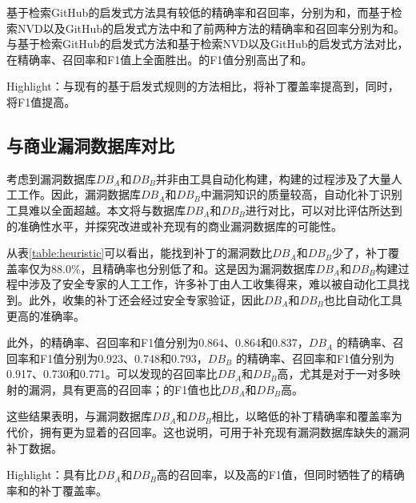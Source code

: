 基于检索GitHub的启发式方法具有较低的精确率和召回率，分别为和，而基于检索NVD以及GitHub的启发式方法中和了前两种方法的精确率和召回率分别为和。与基于检索GitHub的启发式方法和基于检索NVD以及GitHub的启发式方法对比，\tool 在精确率、召回率和F1值上全面胜出。\tool 的F1值分别高出了和。

\begin{tcolorbox}[size=title,opacityfill=0.15]
Highlight：与现有的基于启发式规则的方法相比，\tool 将补丁覆盖率提高到，同时，将F1值提高。
\end{tcolorbox}


\subsection{与商业漏洞数据库对比}

考虑到漏洞数据库$DB_A$和$DB_B$并非由工具自动化构建，构建的过程涉及了大量人工工作。因此，漏洞数据库$DB_A$和$DB_B$中漏洞知识的质量较高，自动化补丁识别工具难以全面超越。本文将\tool 与数据库$DB_A$和$DB_B$进行对比，可以对比评估\tool 所达到的准确性水平，并探究\tool 改进或补充现有的商业漏洞数据库的可能性。%

从表\ref{table:heuristic}可以看出，\tool 能找到补丁的漏洞数比$DB_A$和$DB_B$少了，补丁覆盖率仅为88.0\%，且精确率也分别低了和。这是因为漏洞数据库$DB_A$和$DB_B$构建过程中涉及了安全专家的人工工作，许多补丁由人工收集得来，难以被自动化工具找到。此外，收集的补丁还会经过安全专家验证，因此$DB_A$和$DB_B$也比自动化工具更高的准确率。

此外，\tool 的精确率、召回率和F1值分别为0.864、0.864和0.837，$DB_A$ 的精确率、召回率和F1值分别为0.923、0.748和0.793，$DB_B$ 的精确率、召回率和F1值分别为0.917、0.730和0.771。可以发现\tool 的召回率比$DB_A$和$DB_B$高，尤其是对于一对多映射的漏洞，\tool 具有更高的召回率；\tool 的F1值也比$DB_A$和$DB_B$高。

这些结果表明，与漏洞数据库$DB_A$和$DB_B$相比，\tool 以略低的补丁精确率和覆盖率为代价，拥有更为显着的召回率。这也说明，\tool 可用于补充现有漏洞数据库缺失的漏洞补丁数据。

\begin{tcolorbox}[size=title,opacityfill=0.15]
Highlight：\tool 具有比$DB_A$和$DB_B$高的召回率，以及高的F1值，但同时\tool 牺牲了的精确率和的补丁覆盖率。
\end{tcolorbox}

